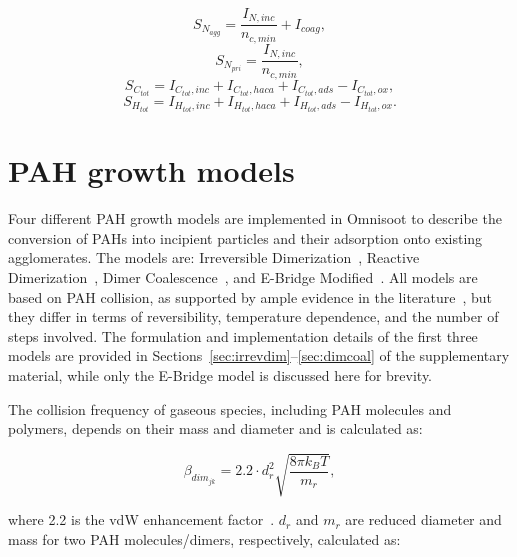 \begin{equation}
	S_{N_{agg}} = \frac{I_{N,inc}}{n_{c,min}}+I_{coag},
	\label{eqn:S_N_agg}
\end{equation}
\begin{equation}
	S_{N_{pri}} = \frac{I_{N,inc}}{n_{c,min}},
	\label{eqn:S_N_pri}
\end{equation}
\begin{equation}
	S_{C_{tot}} = I_{C_{tot},inc}+I_{C_{tot},haca}+I_{C_{tot},ads} - I_{C_{tot},ox},
	\label{eqn:S_C_tot}
\end{equation}
\begin{equation}
	S_{H_{tot}} = I_{H_{tot},inc}+I_{H_{tot},haca}+I_{H_{tot},ads} - I_{H_{tot},ox}.
	\label{eqn:S_H_tot}
\end{equation}


\section{PAH growth models}
\label{sec:pahgrowmodel}
Four different PAH growth models are implemented in Omnisoot to describe the conversion of PAHs into incipient particles and their adsorption onto existing agglomerates. The models are: Irreversible Dimerization~\cite{frenklach1991detailed}, Reactive Dimerization~\citep{kholghy2018reactive}, Dimer Coalescence~\citep{blanquart2009joint}, and E-Bridge Modified~\citep{frenklach2020mechanism}. All models are based on PAH collision, as supported by ample evidence in the literature~\citep{zhao2003measurement, abid2009quantitative, happold2009soot}, but they differ in terms of reversibility, temperature dependence, and the number of steps involved. The formulation and implementation details of the first three models are provided in Sections~\ref{sec:irrevdim}–\ref{sec:dimcoal} of the supplementary material, while only the E-Bridge model is discussed here for brevity.

The collision frequency of gaseous species, including PAH molecules and polymers, depends on their mass and diameter and is calculated as:

\begin{equation}
	\beta_{dim_{jk}}=
	2.2 \cdot d^2_{r} \sqrt{\frac{8 \pi k_B T}{m_{r}}},
	\label{eqn:betadim}
\end{equation}

\noindent where 2.2 is the vdW enhancement factor~\citep{kholghy2018reactive}. ${d_{r}}$ and ${m_{r}}$ are reduced diameter and mass for two PAH molecules/dimers, respectively, calculated as:

